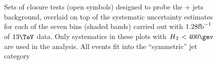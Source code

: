 \begin{figure}[h!]
  \begin{center}
     ~~
     \\
     ~~
     \\
    \caption{Sets of closure tests (open symbols) designed to probe
      the \znunu + jets background, overlaid on top of
      the systematic uncertainty estimates for each of the seven
      \scalht bins (shaded bands) carried out with $1.28\text{fb}^{-1}$ of
      $13\tev$ data. Only systematics in these plots with
      $\scalht<400\gev$ are used in the analysis. All events fit 
      into the ``symmetric'' jet
      category}
    \label{fig:ZinvclosureDataSymlt400}
  \end{center} 
\end{figure}

